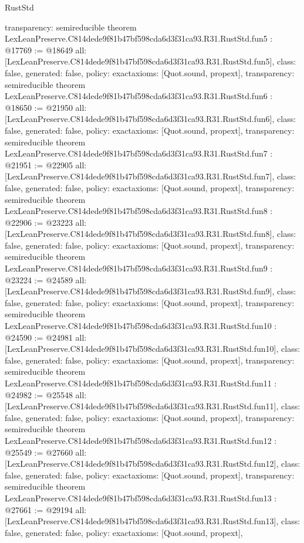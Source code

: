 \begin{lexlean}{RustStd}
\begin{coremodule}
{  transparency: semireducible
}
theorem LexLeanPreserve.C814dede9f81b47bf598cda6d3f31ca93.R31.RustStd.fun5 : @17769 := @18649 {
  all: [LexLeanPreserve.C814dede9f81b47bf598cda6d3f31ca93.R31.RustStd.fun5],
  class: false,
  generated: false,
  policy: exact{axioms: [Quot.sound, propext]},
  transparency: semireducible
}
theorem LexLeanPreserve.C814dede9f81b47bf598cda6d3f31ca93.R31.RustStd.fun6 : @18650 := @21950 {
  all: [LexLeanPreserve.C814dede9f81b47bf598cda6d3f31ca93.R31.RustStd.fun6],
  class: false,
  generated: false,
  policy: exact{axioms: [Quot.sound, propext]},
  transparency: semireducible
}
theorem LexLeanPreserve.C814dede9f81b47bf598cda6d3f31ca93.R31.RustStd.fun7 : @21951 := @22905 {
  all: [LexLeanPreserve.C814dede9f81b47bf598cda6d3f31ca93.R31.RustStd.fun7],
  class: false,
  generated: false,
  policy: exact{axioms: [Quot.sound, propext]},
  transparency: semireducible
}
theorem LexLeanPreserve.C814dede9f81b47bf598cda6d3f31ca93.R31.RustStd.fun8 : @22906 := @23223 {
  all: [LexLeanPreserve.C814dede9f81b47bf598cda6d3f31ca93.R31.RustStd.fun8],
  class: false,
  generated: false,
  policy: exact{axioms: [Quot.sound, propext]},
  transparency: semireducible
}
theorem LexLeanPreserve.C814dede9f81b47bf598cda6d3f31ca93.R31.RustStd.fun9 : @23224 := @24589 {
  all: [LexLeanPreserve.C814dede9f81b47bf598cda6d3f31ca93.R31.RustStd.fun9],
  class: false,
  generated: false,
  policy: exact{axioms: [Quot.sound, propext]},
  transparency: semireducible
}
theorem LexLeanPreserve.C814dede9f81b47bf598cda6d3f31ca93.R31.RustStd.fun10 : @24590 := @24981 {
  all: [LexLeanPreserve.C814dede9f81b47bf598cda6d3f31ca93.R31.RustStd.fun10],
  class: false,
  generated: false,
  policy: exact{axioms: [Quot.sound, propext]},
  transparency: semireducible
}
theorem LexLeanPreserve.C814dede9f81b47bf598cda6d3f31ca93.R31.RustStd.fun11 : @24982 := @25548 {
  all: [LexLeanPreserve.C814dede9f81b47bf598cda6d3f31ca93.R31.RustStd.fun11],
  class: false,
  generated: false,
  policy: exact{axioms: [Quot.sound, propext]},
  transparency: semireducible
}
theorem LexLeanPreserve.C814dede9f81b47bf598cda6d3f31ca93.R31.RustStd.fun12 : @25549 := @27660 {
  all: [LexLeanPreserve.C814dede9f81b47bf598cda6d3f31ca93.R31.RustStd.fun12],
  class: false,
  generated: false,
  policy: exact{axioms: [Quot.sound, propext]},
  transparency: semireducible
}
theorem LexLeanPreserve.C814dede9f81b47bf598cda6d3f31ca93.R31.RustStd.fun13 : @27661 := @29194 {
  all: [LexLeanPreserve.C814dede9f81b47bf598cda6d3f31ca93.R31.RustStd.fun13],
  class: false,
  generated: false,
  policy: exact{axioms: [Quot.sound, propext]},
}
\end{coremodule}
\end{lexlean}
